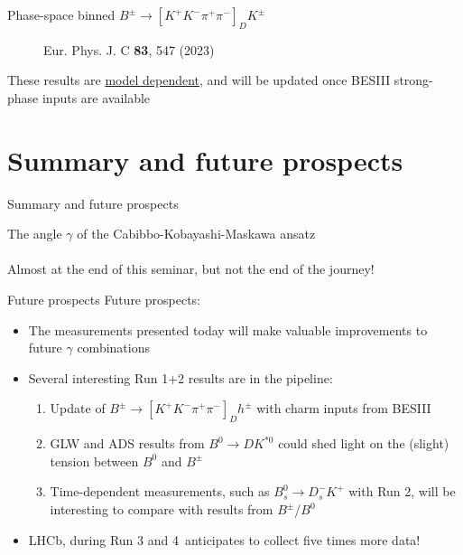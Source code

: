 \documentclass[dvipsnames]{beamer}
\begin{document}
\begin{frame}{Phase-space binned $B^\pm\to[K^+K^-\pi^+\pi^-]_DK^\pm$}
\begin{figure}[htb]
\begin{subfigure}{0.5\textwidth}
    \end{subfigure}
    \vspace{-0.5cm}
    \caption*{\tiny Eur. Phys. J. C \textbf{83}, 547 (2023)}
  \end{figure}
  \vspace{-0.5cm}
  \begin{center}
    {\large These results are \underline{model dependent}, and will be updated once BESIII strong-phase inputs are available}
  \end{center}
\end{frame}

\section{Summary and future prospects}
\begin{frame}{Summary and future prospects}
  \begin{center}
    {\huge The angle $\gamma$ of the Cabibbo-Kobayashi-Maskawa ansatz} \\~\\
    {\large Almost at the end of this seminar, but not the end of the journey!}
  \end{center}
\end{frame}

\begin{frame}{Future prospects}
  \vspace{0.0cm}
  {\Large Future prospects:}
  \vspace{0.3cm}
  \begin{itemize}
    \setlength\itemsep{1.0em}
    \item{The measurements presented today will make valuable improvements to future $\gamma$ combinations}
    \item{Several interesting Run 1$+$2 results are in the pipeline:}
    \begin{enumerate}
      \setlength\itemsep{0.3em}
      \item{Update of $B^\pm\to[K^+K^-\pi^+\pi^-]_Dh^\pm$ with charm inputs from BESIII}
      \item{GLW and ADS results from $B^0\to DK^{*0}$ could shed light on the (slight) tension between $B^0$ and $B^\pm$}
      \item{Time-dependent measurements, such as $B_s^0\to D_s^-K^+$ with Run 2, will be interesting to compare with results from $B^\pm$/$B^0$}
    \end{enumerate}
    \item{LHCb, during Run 3 and 4\, anticipates to collect five times more data!}
  \end{itemize}
\end{frame}
\end{document}
